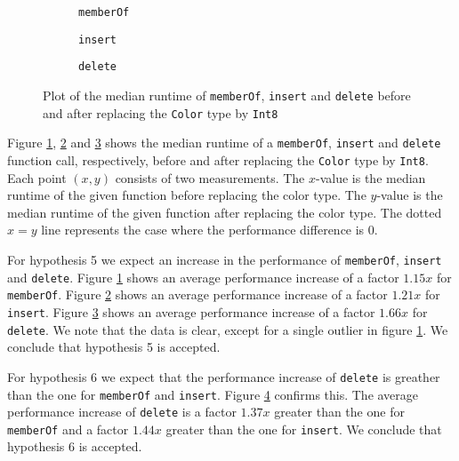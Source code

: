 \documentclass[../main.tex]{subfiles}
\begin{document}
\begin{figure}[H]
  \pgfplotsset{width=\linewidth}
  \centering
  \begin{subfigure}[c]{0.495\textwidth}
  
  \caption{\lstinline{memberOf}}
  \label{memberOf-performance-with-int8}
  \end{subfigure}
  \hfill
  \begin{subfigure}[c]{0.495\textwidth}
  
  \caption{\lstinline{insert}}
  \label{insert-performance-with-int8}
  \end{subfigure}
  \begin{subfigure}[c]{0.495\textwidth}
  
  \caption{\lstinline{delete}}
  \label{delete-performance-with-int8}
  \end{subfigure}
  \caption{Plot of the median \textsf{runtime} of \lstinline{memberOf}, \lstinline{insert} and \lstinline{delete} before and after replacing the \lstinline{Color} type by \lstinline{Int8}}
  \label{performance-with-int8}
\end{figure}

Figure \ref{memberOf-performance-with-int8}, \ref{insert-performance-with-int8} and \ref{delete-performance-with-int8} shows the median runtime of a \lstinline{memberOf}, \lstinline{insert} and \lstinline{delete} function call, respectively, before and after replacing the \lstinline{Color} type by \lstinline{Int8}. Each point $(x, y)$ consists of two measurements. The $x$-value is the median runtime of the given function before replacing the color type. The $y$-value is the median runtime of the given function after replacing the color type. The dotted $x = y$ line represents the case where the performance difference is $0$.

For hypothesis 5 we expect an increase in the performance of \lstinline{memberOf}, \lstinline{insert} and \lstinline{delete}. Figure \ref{memberOf-performance-with-int8} shows an average performance increase of a factor $1.15x$ for \lstinline{memberOf}. Figure \ref{insert-performance-with-int8} shows an average performance increase of a factor $1.21x$ for \lstinline{insert}. Figure \ref{delete-performance-with-int8} shows an average performance increase of a factor $1.66x$ for \lstinline{delete}. We note that the data is clear, except for a single outlier in figure \ref{memberOf-performance-with-int8}. We conclude that hypothesis 5 is accepted.

For hypothesis 6 we expect that the performance increase of \lstinline{delete} is greather than the one for \lstinline{memberOf} and \lstinline{insert}. Figure \ref{performance-with-int8} confirms this. The average performance increase of \lstinline{delete} is a factor $1.37x$ greater than the one for \lstinline{memberOf} and a factor $1.44x$ greater than the one for \lstinline{insert}. We conclude that hypothesis 6 is accepted.
\end{document}
